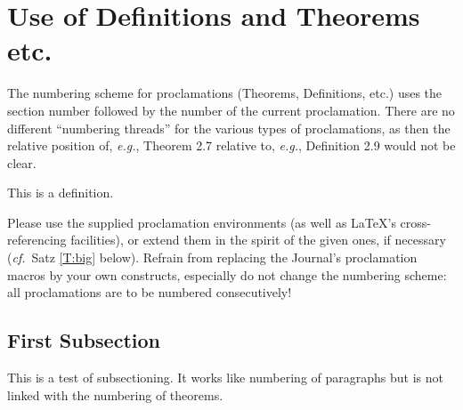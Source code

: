 \documentclass{jpc} %
\theoremstyle{plain}\newtheorem{satz}[thm]{Satz} %
\def\eg{{\em e.g.}}
\def\cf{{\em cf.}}
\begin{document}
\section{Use of  Definitions and Theorems etc.}

  The numbering scheme for proclamations (Theorems, Definitions, etc.)
  uses the section number followed by the number of the current
  proclamation.  There are no different ``numbering threads'' for the
  various types of proclamations, as then the relative position of,
  \eg, Theorem 2.7 relative to, \eg, Definition 2.9 would not be clear.

\begin{defi}\label{D:first}
  This is a definition.
\end{defi}

  Please use the supplied proclamation environments (as well as
  LaTeX's cross-referencing facilities), or extend them in the spirit
  of the given ones, if necessary (\cf~Satz \ref{T:big} below).
  Refrain from replacing the Journal's proclamation macros by your own
  constructs, especially do not change the numbering scheme: all
  proclamations are to be numbered consecutively!

\subsection{First Subsection}

  This is a test of subsectioning.  It works like numbering of
  paragraphs but is not linked with the numbering of theorems.
\end{document}
